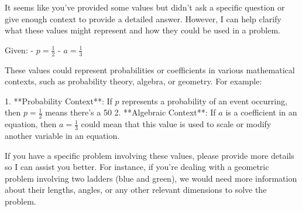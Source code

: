 It seems like you've provided some values but didn't ask a specific question or give enough context to provide a detailed answer. However, I can help clarify what these values might represent and how they could be used in a problem.

Given:
- \( p = \frac{1}{2} \)
- \( a = \frac{1}{3} \)

These values could represent probabilities or coefficients in various mathematical contexts, such as probability theory, algebra, or geometry. For example:

1. **Probability Context**: If \( p \) represents a probability of an event occurring, then \( p = \frac{1}{2} \) means there's a 50%
2. **Algebraic Context**: If \( a \) is a coefficient in an equation, then \( a = \frac{1}{3} \) could mean that this value is used to scale or modify another variable in an equation.

If you have a specific problem involving these values, please provide more details so I can assist you better. For instance, if you're dealing with a geometric problem involving two ladders (blue and green), we would need more information about their lengths, angles, or any other relevant dimensions to solve the problem.